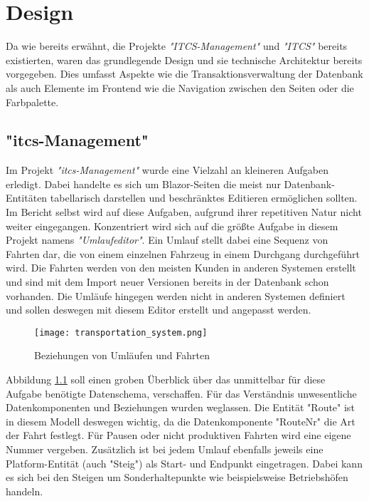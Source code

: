 \chapter{Design}\label{chap:design}

    Da wie bereits erwähnt, die Projekte \emph{"ITCS-Management"} und \emph{"ITCS"} bereits existierten, waren das grundlegende Design und sie technische Architektur bereits vorgegeben.
    Dies umfasst Aspekte wie die Transaktionsverwaltung der Datenbank als auch Elemente im Frontend wie die Navigation zwischen den Seiten oder die Farbpalette.

\section{"itcs-Management"}\label{sec:itcs-management-design}
    Im Projekt \emph{"itcs-Management"} wurde eine Vielzahl an kleineren Aufgaben erledigt. Dabei handelte es sich um Blazor-Seiten die meist nur Datenbank-Entitäten tabellarisch
    darstellen und beschränktes Editieren ermöglichen sollten. Im Bericht selbst wird auf diese Aufgaben, aufgrund ihrer repetitiven Natur nicht weiter eingegangen. Konzentriert wird sich 
    auf die größte Aufgabe in diesem Projekt namens \emph{"Umlaufeditor"}. 
    Ein Umlauf stellt dabei eine Sequenz von Fahrten dar, die von einem einzelnen Fahrzeug in einem Durchgang durchgeführt wird. Die Fahrten werden von den meisten Kunden in anderen 
    Systemen erstellt und sind mit dem Import neuer Versionen bereits in der Datenbank schon vorhanden. Die Umläufe hingegen werden nicht in anderen Systemen definiert und sollen deswegen
    mit diesem Editor erstellt und angepasst werden. 
    \begin{figure}[H]
        \centering
        \texttt{[image: transportation\_system.png]}
        \caption{Beziehungen von Umläufen und Fahrten}
        \label{fig:BeziehungenvonUmläufenundFahrten}
    \end{figure}

    Abbildung \ref{fig:BeziehungenvonUmläufenundFahrten} soll einen groben Überblick über das unmittelbar für diese Aufgabe benötigte Datenschema, verschaffen. Für das Verständnis unwesentliche 
    Datenkomponenten und Beziehungen wurden weglassen. Die Entität "Route" ist in diesem Modell deswegen wichtig, da die Datenkomponente "RouteNr" die Art der Fahrt festlegt. Für Pausen oder nicht produktiven
    Fahrten wird eine eigene Nummer vergeben. Zusätzlich ist bei jedem Umlauf ebenfalls jeweils eine Platform-Entität (auch "Steig") als Start- und Endpunkt eingetragen. Dabei kann es sich bei den 
    Steigen um Sonderhaltepunkte wie beispielsweise Betriebshöfen handeln.

